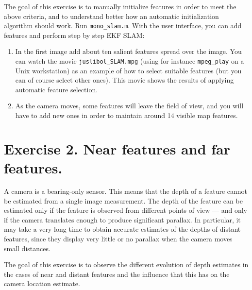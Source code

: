 \documentclass[a4paper,12pt]{article}
\begin{document}
The goal of this exercise is to manually initialize features
in order to meet the above criteria, and to understand better how an
automatic initialization algorithm should work. Run
\texttt{mono\_slam.m}. With the user interface, you can add
features and perform step by step EKF SLAM:
\begin{enumerate}
\item In the first image add about ten salient features spread over the image.
You can watch the movie \texttt{juslibol\_SLAM.mpg} (using for
instance \texttt{mpeg\_play} on a Unix workstation) as an example of how
to select suitable features (but you
can of course select other ones). This movie shows the results of
applying automatic feature selection.
\item As the camera moves, some features will leave the field of view, and you will
have to add new ones in order to maintain around 14 visible map features.
\end{enumerate}


\section{Exercise 2. Near features and far features.}
A camera is a bearing-only sensor. This means that the depth of a
feature cannot be estimated from a single image measurement. The
depth of the feature can be estimated only if the feature is
observed from different points of view --- and only if the camera
translates enough to produce significant parallax. In particular, it
may take a very long time to obtain accurate estimates of the depths
of distant features, since they display very little or no parallax
when the camera moves small distances.

The goal of this exercise is to observe the different
evolution of depth estimates in the cases of near and distant features
and the influence that this has on the
camera location estimate.
\end{document}
